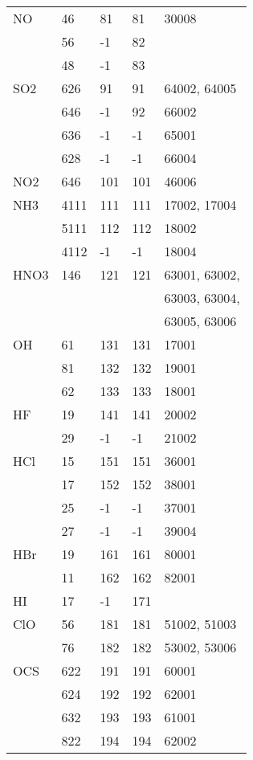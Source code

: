 \begin{longtable}{lllll}
\hline                  
  NO& 46&  81&    81&  30008\\
    & 56&  -1&    82&\\
    & 48&  -1&    83&\\
\hline                  
  SO2& 626&  91&    91&  64002, 64005\\
     & 646&  -1&    92&  66002\\
     & 636&  -1&    -1&  65001\\
     & 628&  -1&    -1&  66004\\
\hline                  
  NO2& 646&  101&   101&  46006\\
\hline                  
  NH3& 4111&  111&   111&  17002, 17004\\
     & 5111&  112&   112&  18002\\
     & 4112&  -1&    -1&  18004\\
\hline                  
  HNO3& 146&  121&   121&  63001, 63002,\\
      &    &     &      &  63003, 63004,\\
      &    &     &      &  63005, 63006\\
\hline                  
  OH& 61&  131&   131&  17001\\
    & 81&  132&   132&  19001\\
    & 62&  133&   133&  18001\\
\hline                  
  HF& 19&  141&   141&  20002\\
    & 29&  -1&    -1&  21002\\
\hline                  
  HCl&15&  151&   151&  36001\\
     &17&  152&   152&  38001\\
     &25&  -1&    -1&  37001\\
     &27&  -1&    -1&  39004\\
\hline                  
  HBr& 19&  161&   161&  80001\\
     & 11&  162&   162&  82001\\
\hline                  
  HI& 17&  -1&   171&\\
\hline                  
  ClO& 56&  181&   181&  51002, 51003\\
     & 76&  182&   182&  53002, 53006\\
\hline                  
  OCS& 622&  191&   191&  60001\\
     & 624&  192&   192&  62001\\
     & 632&  193&   193&  61001\\
     & 822&  194&   194&  62002\\

\end{longtable}
